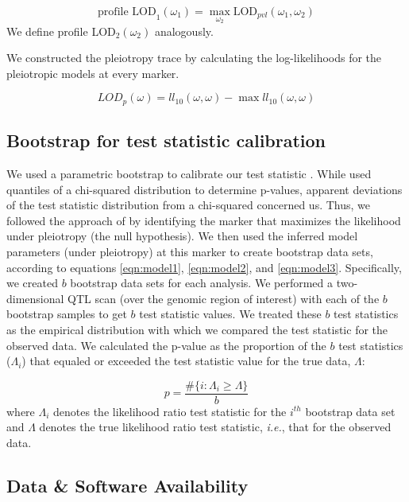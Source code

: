 \documentclass[12pt,twoside, lineno]{gsajnl}
\begin{document}
\begin{equation}
\text{profile LOD}_1(\omega_1) = \max_{\omega_2}\text{LOD}_{pvl}(\omega_1, \omega_2)
\label{eq:profilelod}
\end{equation}
We define profile LOD$_2(\omega_2)$ analogously.

We constructed the pleiotropy trace by calculating the log-likelihoods for the pleiotropic models at every marker.

\begin{equation}
LOD_{p}(\omega) = ll_{10}(\omega, \omega) - \max ll_{10}(\omega, \omega)
\label{eq:lodp}
\end{equation}




\subsection{Bootstrap for test statistic calibration}

We used a parametric bootstrap to calibrate our test statistic \citep{efron1979}. While \citet{jiang1995multiple} used quantiles of a chi-squared distribution to determine p-values, apparent deviations of the test statistic distribution from a chi-squared concerned us. Thus, we followed the approach of \citet{tian2016dissection} by identifying the marker that maximizes the likelihood under pleiotropy (the null hypothesis). We then used the inferred model parameters (under pleiotropy) at this marker to create bootstrap data sets, according to equations \ref{eqn:model1}, \ref{eqn:model2}, and \ref{eqn:model3}. Specifically, we created $b$ bootstrap data sets for each analysis. We performed a two-dimensional QTL scan (over the genomic region of interest) with each of the $b$ bootstrap samples to get $b$ test statistic values. We treated these $b$ test statistics as the empirical distribution with which we compared the test statistic for the observed data. We calculated the p-value as the proportion of the $b$ test statistics ($\Lambda_i$) that equaled or exceeded the test statistic value for the true data, $\Lambda$:

\begin{equation}
p = \frac{\# \lbrace i:\Lambda_i \geq \Lambda\rbrace}{b}
\end{equation}
where $\Lambda_{i}$ denotes the likelihood ratio test statistic for the $i^{th}$ bootstrap data set and $\Lambda$ denotes the true likelihood ratio test statistic, \textit{i.e.}, that for the observed data.

\subsection{Data \& Software Availability}
\end{document}
